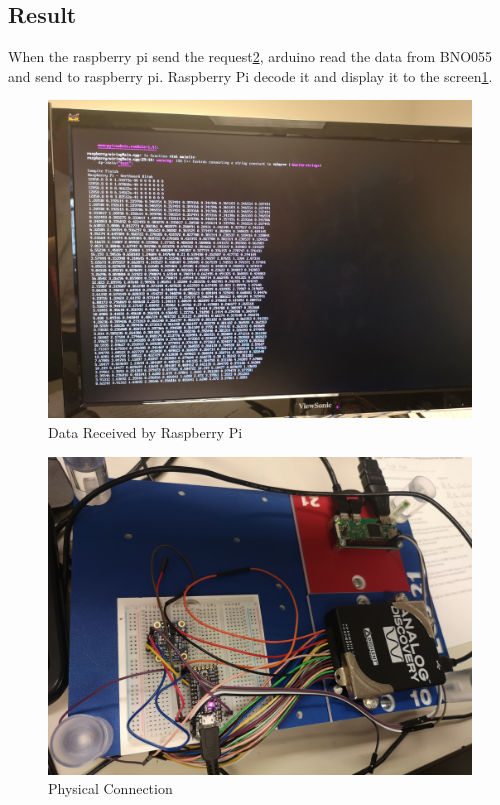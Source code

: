 \documentclass{article}
\begin{document}
	\subsection{Result}
	When the raspberry pi send the request\ref{ana_ardu}, arduino read the data from BNO055 and send to raspberry pi. Raspberry Pi decode it and display it to the screen\ref{rbp_data}.
	\begin{figure}[hb]
		\includegraphics[width=\textwidth]{img/Lab2_Arduino-rbp_1.jpg}
		\caption{Data Received by Raspberry Pi} 
		\label{rbp_data}
	\end{figure}
	\begin{figure}[hb]
		\includegraphics[width=\textwidth]{img/Lab2_Arduino-rbp_2.jpg}
		\caption{Physical Connection} 
		\label{ana_ardu}
	\end{figure}
	\clearpage
\end{document}
